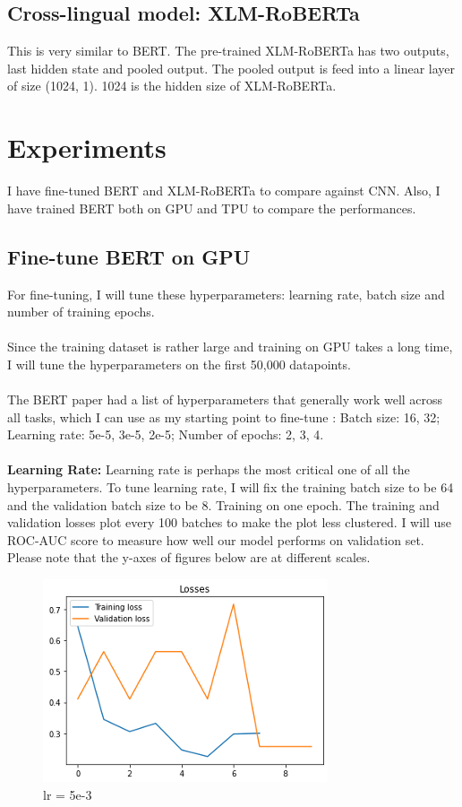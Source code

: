 \documentclass[11pt,a4paper]{article}
\begin{document}
\subsection{Cross-lingual model: XLM-RoBERTa}

This is very similar to BERT. The pre-trained XLM-RoBERTa has two outputs, last hidden state and pooled output. The pooled output is feed into a linear layer of size (1024, 1). 1024 is the hidden size of XLM-RoBERTa.

\section{Experiments}

I have fine-tuned BERT and XLM-RoBERTa to compare against CNN. Also, I have trained BERT both on GPU and TPU to compare the performances.\\

\subsection{Fine-tune BERT on GPU}

For fine-tuning, I will tune these hyperparameters: learning rate, batch size and number of training epochs.\\
\\
Since the training dataset is rather large and training on GPU takes a long time, I will tune the hyperparameters on the first 50,000 datapoints.\\
\\
The BERT paper had a list of hyperparameters that generally work well across all tasks, which I can use as my starting point to fine-tune \cite{BERT}: 
Batch size: 16, 32; Learning rate: 5e-5, 3e-5, 2e-5; Number of epochs: 2, 3, 4.\\
\\
\textbf {Learning Rate:} Learning rate is perhaps the most critical one of all the hyperparameters. To tune learning rate, I will fix the training batch size to be 64 and the validation batch size to be 8. Training on one epoch. The training and validation losses plot every 100 batches to make the plot less clustered. I will use ROC-AUC score to measure how well our model performs on validation set. Please note that the y-axes of figures below are at different scales.\\

\begin{figure}[!htbp]
	\centering
	\includegraphics{figures/figure6.png}
	\caption{\label{fig:my-label}  lr = 5e-3}
\end{figure}
\end{document}
